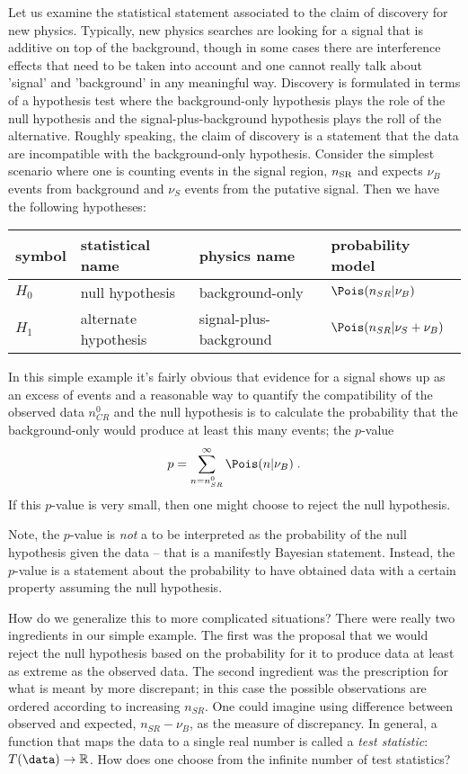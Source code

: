 Let us examine the statistical statement associated to the claim of discovery for new physics.  Typically, new physics searches are looking for a signal that is additive on top of the background, though in some cases there are interference effects that need to be taken into account and one cannot really talk about 'signal' and 'background' in any meaningful way.  Discovery is formulated in terms of a hypothesis test where the background-only hypothesis plays the role of the null hypothesis and the signal-plus-background hypothesis plays the roll of the alternative.  Roughly speaking, the claim of discovery is a statement that the data are incompatible with the background-only hypothesis.  Consider the simplest scenario where one is counting events in the signal region, $n_{\rm SR}$ and expects $\nu_B$ events from background and $\nu_S$ events from the putative signal.    Then we have the following hypotheses:
\begin{center}
\begin{tabular}{llll}
symbol & statistical name & physics name & probability model \\ \hline
$H_0$ &  null hypothesis & background-only & $\Pois(n_{SR} | \nu_B)$ \\
$H_1$ &  alternate hypothesis & signal-plus-background & $\Pois(n_{SR} | \nu_S+\nu_B)$ 
\end{tabular}
\end{center}
In this simple example it's fairly obvious that evidence for a signal shows up as an excess of events and a reasonable way to quantify the compatibility of the observed data $n_{CR}^0$ and the null hypothesis is to calculate the probability that the background-only would produce at least this many events; the $p$-value
\begin{equation}
p = \sum_{n=n_{SR}^0}^\infty \Pois(n | \nu_B) \; .
\end{equation}
If this $p$-value is very small, then one might choose to reject the null hypothesis.


Note, the $p$-value is \textit{not} a to be interpreted as the probability of the null hypothesis given the data -- that is a manifestly Bayesian statement.  Instead, the $p$-value is a statement about the probability to have obtained data with a certain property assuming the null hypothesis.


How do we generalize this to more complicated situations?  There were really two ingredients in our simple example.  The first was the proposal that we would reject the null hypothesis based on the probability for it to produce data at least as extreme  as the observed data.  The second ingredient was the prescription for what is meant by more discrepant; in this case the possible observations are ordered according to increasing $n_{SR}$.  One could imagine using difference between observed and expected, $n_{SR}-\nu_B$, as the measure of discrepancy.  In general, a function that maps the data to a single real number is called a \textit{test statistic}: $T(\data)\to\mathbb{R}$.  How does one choose from the infinite number of test statistics?


